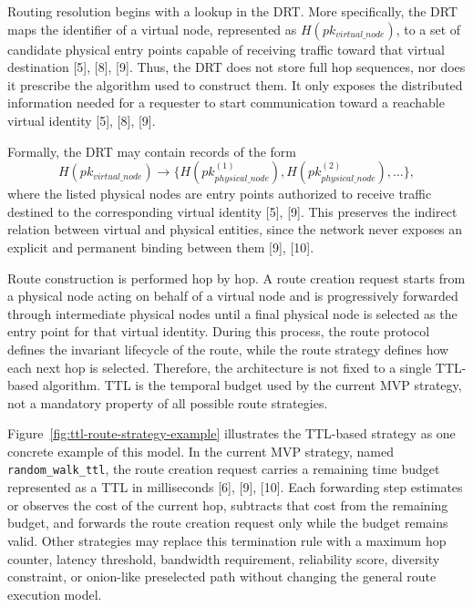 \documentclass[12pt,a4paper]{article}
\begin{document}
Routing resolution begins with a lookup in the DRT. More specifically, the DRT maps the identifier of a virtual node, represented as $H(pk_{virtual\_node})$, to a set of candidate physical entry points capable of receiving traffic toward that virtual destination [5], [8], [9]. Thus, the DRT does not store full hop sequences, nor does it prescribe the algorithm used to construct them. It only exposes the distributed information needed for a requester to start communication toward a reachable virtual identity [5], [8], [9].

\thesisdrttikz

Formally, the DRT may contain records of the form
\[
H(pk_{virtual\_node}) \rightarrow \{H(pk_{physical\_node}^{(1)}), H(pk_{physical\_node}^{(2)}), \dots\},
\]
where the listed physical nodes are entry points authorized to receive traffic destined to the corresponding virtual identity [5], [9]. This preserves the indirect relation between virtual and physical entities, since the network never exposes an explicit and permanent binding between them [9], [10].

\thesisroutestrategyconstructiontikz

\thesishopbyhoptikz

Route construction is performed hop by hop. A route creation request starts from a physical node acting on behalf of a virtual node and is progressively forwarded through intermediate physical nodes until a final physical node is selected as the entry point for that virtual identity. During this process, the route protocol defines the invariant lifecycle of the route, while the route strategy defines how each next hop is selected. Therefore, the architecture is not fixed to a single TTL-based algorithm. TTL is the temporal budget used by the current MVP strategy, not a mandatory property of all possible route strategies.

Figure~\ref{fig:ttl-route-strategy-example} illustrates the TTL-based strategy as one concrete example of this model. In the current MVP strategy, named \texttt{random\_walk\_ttl}, the route creation request carries a remaining time budget represented as a TTL in milliseconds [6], [9], [10]. Each forwarding step estimates or observes the cost of the current hop, subtracts that cost from the remaining budget, and forwards the route creation request only while the budget remains valid. Other strategies may replace this termination rule with a maximum hop counter, latency threshold, bandwidth requirement, reliability score, diversity constraint, or onion-like preselected path without changing the general route execution model.
\end{document}
